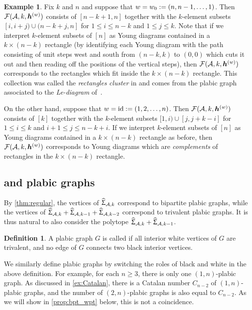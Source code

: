 \documentclass[11pt]{amsart}
\theoremstyle{plain}
\theoremstyle{definition}
\newtheorem{definition}[theorem]{Definition}
\newtheorem{example}[theorem]{Example}
\def\A{\mathcal{A}}
\def\HSP{\widehat\Upsigma}
\def\Sigma{\HSP}
\begin{document}
\begin{example}\label{ex:extreme}
Fix $k$ and $n$ and suppose that $w=w_0:=(n,n-1,\dots,1)$. Then $\Compatw$
	consists of $[n-k+1,n]$  together with 
the $k$-element subsets 
        $[i, i+j) \cup (n-k+j,n]$ for
$1 \leq i \leq n-k$ and $1 \leq j \leq k$. 
Note that if we interpret $k$-element subsets of $[n]$
as Young diagrams contained in a $k \times (n-k)$ rectangle
(by identifying each Young diagram with the path consisting
of unit steps west and south
        from  $(n-k,k)$ to $(0,0)$ which cuts it out and then
reading off the positions of the vertical steps),
then $\Compatw$
	corresponds to the rectangles which fit inside the
$ k \times (n-k)$ rectangle.  This collection was called the
\emph{rectangles cluster} in \cite{RW}
	and comes from the plabic graph associated to the \emph{Le-diagram} of~\cite{Pos06}.


On the other hand, suppose that $w=\operatorname{id}:=(1,2,\dots,n)$. Then $\Compatw$
 consists of $[k]$ together with the
$k$-element subsets 
$[1,i) \cup [j,j+k-i]$ for
$1 \leq i \leq k$ and $i+1 \leq j \leq n-k+i$.
If we interpret $k$-element subsets of $[n]$
as Young diagrams contained in a $k \times (n-k)$ rectangle
as before, then
$\Compatw$  corresponds to Young diagrams which are
        \emph{complements} of rectangles in the
        $k \times (n-k)$ rectangle.
\end{example}




\subsection{\Bpt and \wpt plabic graphs} 
By \cref{thm:regular}, the vertices of $\Sigma_{\A,k}$ correspond to bipartite plabic graphs, while the vertices of $\Sigma_{\A,k}+\Sigma_{\A,k-1}+\Sigma_{\A,k-2}$ correspond to trivalent plabic graphs. It is thus natural to also consider the polytope $\Sigma_{\A,k}+\Sigma_{\A,k-1}$.

\begin{definition}
A plabic graph $G$ is called \emph{\bpt} if all interior white vertices of $G$ are trivalent, and no edge of $G$ connects two black interior vertices. 
\end{definition}
\noindent We similarly define \emph{\wpt} plabic graphs by switching the roles of black and white in the above definition. For example, for each $n\geq 3$, there is only one \wpt $(1,n)$-plabic graph. As discussed in \cref{ex:Catalan}, there is a Catalan number $C_{n-2}$ of \bpt $(1,n)$-plabic graphs, and the number of \wpt $(2,n)$-plabic graphs is also equal to $C_{n-2}$. As we will show in \cref{prop:bpt_wpt} below, this is not a coincidence.
\end{document}

